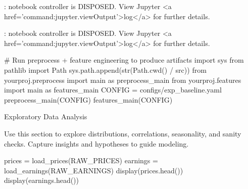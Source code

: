 \documentclass[
  letterpaper,
  DIV=11,
  numbers=noendperiod]{scrartcl}
\newenvironment{Shaded}{\begin{snugshade}}{\end{snugshade}}
\newcommand{\BuiltInTok}[1]{\textcolor[rgb]{0.00,0.23,0.31}{#1}}
\newcommand{\CommentTok}[1]{\textcolor[rgb]{0.37,0.37,0.37}{#1}}
\newcommand{\ImportTok}[1]{\textcolor[rgb]{0.00,0.46,0.62}{#1}}
\newcommand{\NormalTok}[1]{\textcolor[rgb]{0.00,0.23,0.31}{#1}}
\newcommand{\OperatorTok}[1]{\textcolor[rgb]{0.37,0.37,0.37}{#1}}
\newcommand{\StringTok}[1]{\textcolor[rgb]{0.13,0.47,0.30}{#1}}
\renewenvironment{Shaded}{%
  \begin{tcolorbox}[%
    colback=codebg,%
    colframe=codebg,%
    borderline west={3pt}{0pt}{sectionblue},%
    boxrule=0pt,%
    arc=0pt,%
    boxsep=5pt,%
    left=2mm,%
    right=2mm,%
    top=2mm,%
    bottom=2mm%
  ]%
}{%
  \end{tcolorbox}%
}
\begin{document}
\begin{Highlighting}
\textcolor{black}{: }
\textcolor{black}{}\textcolor{QuartoInternalColor1}{notebook controller is DISPOSED. }
\textcolor{QuartoInternalColor1}{}\textcolor{QuartoInternalColor1}{View Jupyter <a href='command:jupyter.viewOutput'>log</a> for further details.}
\end{Highlighting}

\begin{Highlighting}
\textcolor{black}{: }
\textcolor{black}{}\textcolor{QuartoInternalColor1}{notebook controller is DISPOSED. }
\textcolor{QuartoInternalColor1}{}\textcolor{QuartoInternalColor1}{View Jupyter <a href='command:jupyter.viewOutput'>log</a> for further details.}
\end{Highlighting}

\begin{Shaded}
\begin{Highlighting}[]
\CommentTok{\# Run preprocess + feature engineering to produce artifacts}
\ImportTok{import}\NormalTok{ sys}
\ImportTok{from}\NormalTok{ pathlib }\ImportTok{import}\NormalTok{ Path}
\NormalTok{sys.path.append(}\BuiltInTok{str}\NormalTok{(Path.cwd() }\OperatorTok{/} \StringTok{\textquotesingle{}src\textquotesingle{}}\NormalTok{))}
\ImportTok{from}\NormalTok{ yourproj.preprocess }\ImportTok{import}\NormalTok{ main }\ImportTok{as}\NormalTok{ preprocess\_main}
\ImportTok{from}\NormalTok{ yourproj.features }\ImportTok{import}\NormalTok{ main }\ImportTok{as}\NormalTok{ features\_main}
\NormalTok{CONFIG }\OperatorTok{=} \StringTok{\textquotesingle{}configs/exp\_baseline.yaml\textquotesingle{}}
\NormalTok{preprocess\_main(CONFIG)}
\NormalTok{features\_main(CONFIG)}
\end{Highlighting}
\end{Shaded}

Exploratory Data Analysis

Use this section to explore distributions, correlations, seasonality,
and sanity checks. Capture insights and hypotheses to guide modeling.

\begin{Shaded}
\begin{Highlighting}[]
\NormalTok{prices }\OperatorTok{=}\NormalTok{ load\_prices(RAW\_PRICES)}
\NormalTok{earnings }\OperatorTok{=}\NormalTok{ load\_earnings(RAW\_EARNINGS)}
\NormalTok{display(prices.head())}
\NormalTok{display(earnings.head())}
\end{Highlighting}
\end{Shaded}
\end{document}
